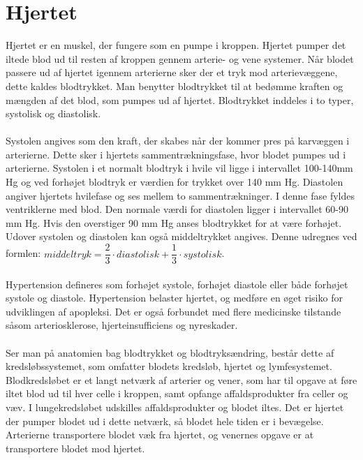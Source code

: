 \chapter{Hjertet}
Hjertet er en muskel, der fungere som en pumpe i kroppen. Hjertet pumper det iltede blod ud til resten af kroppen gennem arterie- og vene systemer. Når blodet passere ud af hjertet igennem arterierne sker der et tryk mod arterievæggene, dette kaldes blodtrykket. Man benytter blodtrykket til at bedømme kraften og mængden af det blod, som pumpes ud af hjertet. Blodtrykket inddeles i to typer, systolisk og diastolisk. \\\\
Systolen angives som den kraft, der skabes når der kommer pres på karvæggen i arterierne. Dette sker i hjertets sammentrækningsfase, hvor blodet pumpes ud i arterierne. Systolen i et normalt blodtryk i hvile vil ligge i intervallet 100-140mm Hg og ved forhøjet blodtryk er værdien for trykket over 140 mm Hg. Diastolen angiver hjertets hvilefase og ses mellem to sammentrækninger. I denne fase fyldes ventriklerne med blod. Den normale værdi for diastolen ligger i intervallet 60-90 mm Hg. Hvis den overstiger 90 mm Hg anses blodtrykket for at være forhøjet. Udover systolen og diastolen kan også middeltrykket angives. Denne udregnes ved formlen: $middeltryk = \dfrac{2}{3}\cdot diastolisk + \dfrac{1}{3}\cdot systolisk$.  \cite{blodtrykwiki}
\\\\
Hypertension defineres som forhøjet systole, forhøjet diastole eller både forhøjet systole og diastole. Hypertension belaster hjertet, og medføre en øget risiko for udviklingen af apopleksi. Det er også forbundet med flere medicinske tilstande såsom arteriosklerose, hjerteinsufficiens og nyreskader. \cite{hypertension}
\\\\
Ser man på anatomien bag blodtrykket og blodtryksændring, består dette af kredsløbssystemet, som omfatter blodets kredsløb, hjertet og lymfesystemet. Blodkredsløbet er et langt netværk af arterier og vener, som har til opgave at føre iltet blod ud til hver celle i kroppen, samt opfange affaldsprodukter fra celler og væv. \cite{pulmonal}  I lungekredsløbet udskilles affaldsprodukter og blodet iltes. Det er hjertet der pumper blodet ud i dette netværk, så blodet hele tiden er i bevægelse. Arterierne transportere blodet væk fra hjertet, og venernes opgave er at transportere blodet mod hjertet. \\\\
